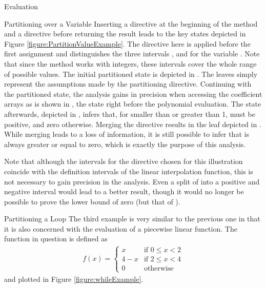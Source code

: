 \begin{chapter}{Evaluation}
\begin{section}{Partitioning over a Variable}
		Inserting a  directive at the beginning of the method and a  directive before returning the result leads to the key states depicted in Figure \ref{figure:PartitionValueExample}. The directive here is applied before the first assignment and distinguishes the three intervals \code{[-inf,2]}, \code{[-1,1]} and \code{[2,inf]} for the variable . Note that since the method works with integers, these intervals cover the whole range of possible values. The initial partitioned state is depicted in \one. The leaves simply represent the assumptions made by the partitioning directive. Continuing with the partitioned state, the analysis gains in precision when accessing the coefficient arrays as is shown in \two, the state right before the polynomial evaluation. The state afterwards, depicted in \three, infers that, for  smaller than  or greater than 1,  must be positive, and zero otherwise. Merging the directive results in the leaf depicted in \four. While merging leads to a loss of information, it is still possible to infer that  is always greater or equal to zero, which is exactly the purpose of this analysis.

		Note that although the intervals for the directive chosen for this illustration coincide with the definition intervals of the linear interpolation function, this is not necessary to gain precision in the analysis. Even a split of  into a positive and negative interval would lead to a better result, though it would no longer be possible to prove the lower bound of zero (but that of ).
	\end{section}


	\begin{section}{Partitioning a Loop}
		The third example is very similar to the previous one in that it is also concerned with the evaluation of a piecewise linear function. The function in question is defined as
		\begin{align}
			f(x) = 
			\begin{cases}
				x & \text{if } 0 \leq x < 2 \\
				4 - x & \text{if } 2 \leq x < 4 \\
				0 & \text{otherwise}
			\end{cases}
		\end{align} 
		and plotted in Figure \ref{figure:whileExample}.


\end{section}
\end{chapter}

